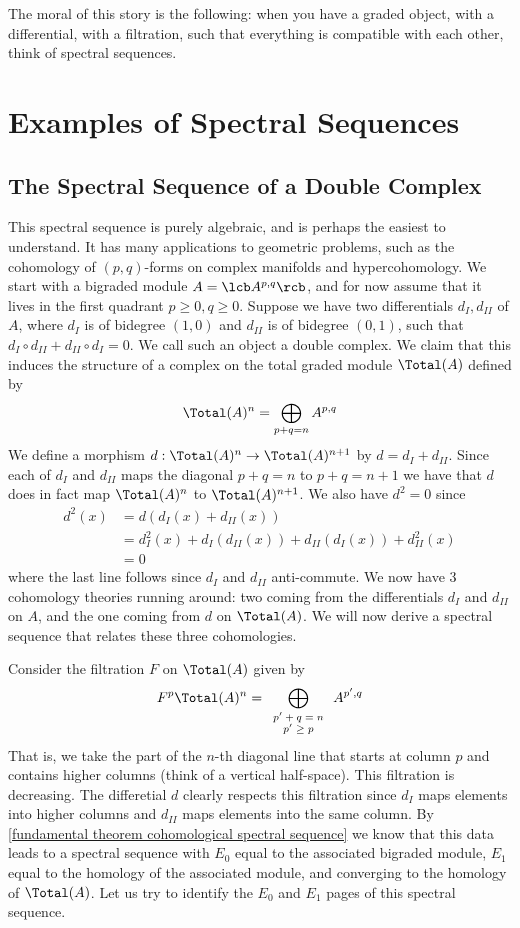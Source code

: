 The moral of this story is the following: when you have a graded object, with a differential, with a filtration, such that everything is compatible with each other, think of spectral sequences.



\section{Examples of Spectral Sequences}

\subsection{The Spectral Sequence of a Double Complex}

This spectral sequence is purely algebraic, and is perhaps the easiest to understand. It has many applications to geometric problems, such as the cohomology of $(p,q)$-forms on complex manifolds and hypercohomology. We start with a bigraded module $A = \lcb A^{p,q} \rcb$, and for now assume that it lives in the first quadrant $p \geq 0, q \geq 0$. Suppose we have two differentials $d_I,d_{II}$ of $A$, where $d_I$ is of bidegree $(1,0)$ and $d_{II}$ is of bidegree $(0,1)$, such that $d_I \circ d_{II} + d_{II} \circ d_I = 0$. We call such an object a double complex. We claim that this induces the structure of a complex on the total graded module $\Total(A)$ defined by
\[ \Total(A)^n = \bigoplus_{p+q=n} A^{p,q} \]
We define a morphism $d : \Total(A)^n \rightarrow \Total(A)^{n+1}$ by $d = d_I + d_{II}$. Since each of $d_I$ and $d_{II}$ maps the diagonal $p+q=n$ to $p+q=n+1$ we have that $d$ does in fact map $\Total(A)^n$ to $\Total(A)^{n+1}$. We also have $d^2 = 0$ since
\begin{align*}
	d^2(x) &= d(d_I(x) + d_{II}(x)) \\
	           &= d_I^2(x) + d_I(d_{II}(x)) + d_{II}(d_I(x)) + d_{II}^2(x) \\
	           &= 0
\end{align*}
where the last line follows since $d_I$ and $d_{II}$ anti-commute. We now have 3 cohomology theories running around: two coming from the differentials $d_I$ and $d_{II}$ on $A$, and the one coming from $d$ on $\Total(A)$. We will now derive a spectral sequence that relates these three cohomologies.

Consider the filtration $F$ on $\Total(A)$ given by
\[ F^p \Total(A)^n = \bigoplus_{\scriptsize \begin{array}{c} p'+q=n \\ p' \geq p \end{array} } A^{p',q} \]
That is, we take the part of the $n$-th diagonal line that starts at column $p$ and contains higher columns (think of a vertical half-space). This filtration is decreasing. The differetial $d$ clearly respects this filtration since $d_I$ maps elements into higher columns and $d_{II}$ maps elements into the same column. By \ref{fundamental theorem cohomological spectral sequence} we know that this data leads to a spectral sequence with $E_0$ equal to the associated bigraded module, $E_1$ equal to the homology of the associated module, and converging to the homology of $\Total(A)$. Let us try to identify the $E_0$ and $E_1$ pages of this spectral sequence.

